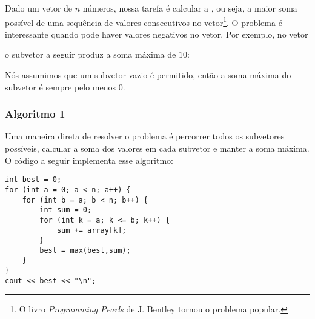 Dado um vetor de $n$ números, 
nossa tarefa é calcular a 
, ou seja, 
a maior soma possível de 
uma sequência de valores consecutivos 
no vetor\footnote{O livro \emph{Programming Pearls} de J. Bentley \cite{ben86} tornou o problema popular.}. 
O problema é interessante quando pode haver 
valores negativos no vetor. 
Por exemplo, no vetor
\begin{center}
\end{center}
\begin{samepage}
o subvetor a seguir produz a soma máxima de $10$:
\begin{center}
\end{center}
\end{samepage}

Nós assumimos que um subvetor vazio é permitido, então a soma máxima do subvetor é sempre pelo menos $0$.

\subsubsection{Algoritmo 1}

Uma maneira direta de resolver o problema
é percorrer todos os subvetores possíveis, 
calcular a soma dos valores em cada subvetor e manter 
a soma máxima. 
O código a seguir implementa esse algoritmo:

\begin{lstlisting}
int best = 0;
for (int a = 0; a < n; a++) {
    for (int b = a; b < n; b++) {
        int sum = 0;
        for (int k = a; k <= b; k++) {
            sum += array[k];
        }
        best = max(best,sum);
    }
}
cout << best << "\n";
\end{lstlisting}

